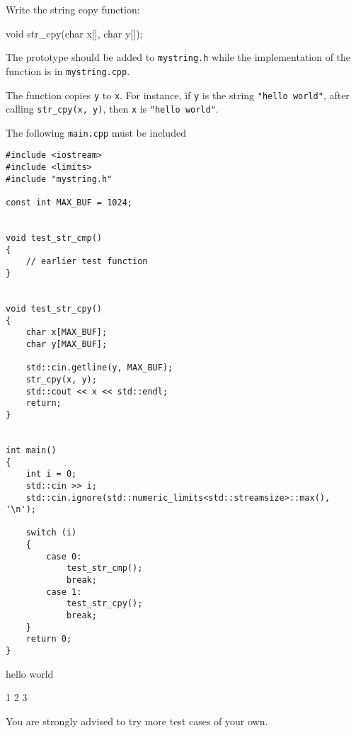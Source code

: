 Write the string copy function:
\begin{console}
void str_cpy(char x[], char y[]);
\end{console}
The prototype should be added to \verb!mystring.h!
while the implementation of the function is in \verb!mystring.cpp!.

The function copies \verb!y! to \verb!x!.
For instance, if \verb!y! is the string \verb!"hello world"!,
after calling \verb!str_cpy(x, y)!, then \verb!x! is \verb!"hello world"!.

The following \verb!main.cpp! must be included
{\small
\begin{Verbatim}[frame=single,commandchars=\~\!\@]
#include <iostream>
#include <limits>
#include "mystring.h"

const int MAX_BUF = 1024;


void test_str_cmp()
{
    // earlier test function
}


void test_str_cpy()
{
    char x[MAX_BUF];
    char y[MAX_BUF];

    std::cin.getline(y, MAX_BUF);
    str_cpy(x, y);
    std::cout << x << std::endl;
    return;
}


int main()
{
    int i = 0;
    std::cin >> i;
    std::cin.ignore(std::numeric_limits<std::streamsize>::max(), '\n');

    switch (i)
    {
        case 0:
            test_str_cmp();
            break;
        case 1:
            test_str_cpy();
            break;
    }
    return 0;
}
\end{Verbatim}
}

\resett

\nextt
\begin{console}[commandchars=\\\{\}]
hello world
\end{console}

\nextt
\begin{console}[commandchars=\\\{\}]
1 2 3
\end{console}

You are strongly advised to try more test cases of your own.
